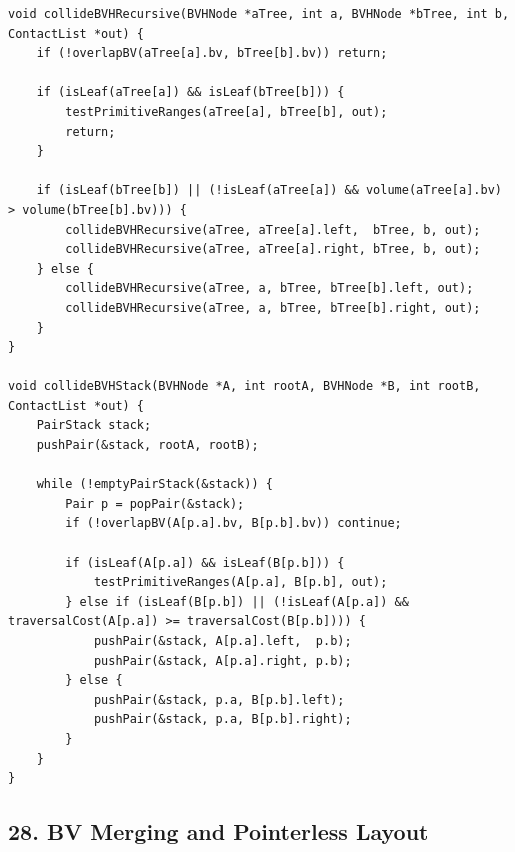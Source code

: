 \documentclass[10pt,letterpaper]{article}
\begin{document}
\begin{verbatim}
void collideBVHRecursive(BVHNode *aTree, int a, BVHNode *bTree, int b, ContactList *out) {
    if (!overlapBV(aTree[a].bv, bTree[b].bv)) return;

    if (isLeaf(aTree[a]) && isLeaf(bTree[b])) {
        testPrimitiveRanges(aTree[a], bTree[b], out);
        return;
    }

    if (isLeaf(bTree[b]) || (!isLeaf(aTree[a]) && volume(aTree[a].bv) > volume(bTree[b].bv))) {
        collideBVHRecursive(aTree, aTree[a].left,  bTree, b, out);
        collideBVHRecursive(aTree, aTree[a].right, bTree, b, out);
    } else {
        collideBVHRecursive(aTree, a, bTree, bTree[b].left, out);
        collideBVHRecursive(aTree, a, bTree, bTree[b].right, out);
    }
}

void collideBVHStack(BVHNode *A, int rootA, BVHNode *B, int rootB, ContactList *out) {
    PairStack stack;
    pushPair(&stack, rootA, rootB);

    while (!emptyPairStack(&stack)) {
        Pair p = popPair(&stack);
        if (!overlapBV(A[p.a].bv, B[p.b].bv)) continue;

        if (isLeaf(A[p.a]) && isLeaf(B[p.b])) {
            testPrimitiveRanges(A[p.a], B[p.b], out);
        } else if (isLeaf(B[p.b]) || (!isLeaf(A[p.a]) && traversalCost(A[p.a]) >= traversalCost(B[p.b]))) {
            pushPair(&stack, A[p.a].left,  p.b);
            pushPair(&stack, A[p.a].right, p.b);
        } else {
            pushPair(&stack, p.a, B[p.b].left);
            pushPair(&stack, p.a, B[p.b].right);
        }
    }
}
\end{verbatim}


\subsection*{28. BV Merging and Pointerless Layout}
\end{document}
